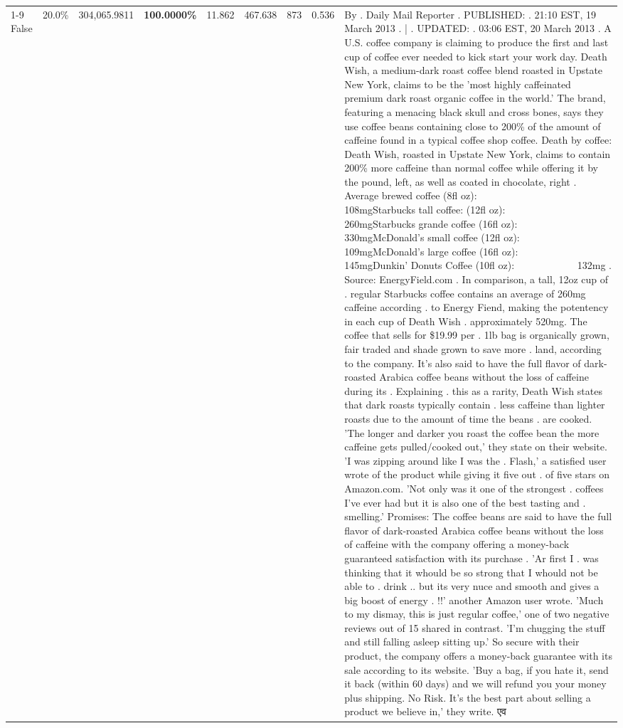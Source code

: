 \begin{table}[H]
{\begin{tabular}{lllrlllll}
\cline{1-9}
False & 20.0\% & 304,065.9811 & \bfseries \color{red} 100.0000\% & 11.862 & 467.638 & 873 & 0.536 & By . Daily Mail Reporter . PUBLISHED: . 21:10 EST, 19 March 2013 . | . UPDATED: . 03:06 EST, 20 March 2013 . A U.S. coffee company is claiming to produce the first and last cup of coffee ever needed to kick start your work day. Death Wish, a medium-dark roast coffee blend roasted in Upstate New York, claims to be the 'most highly caffeinated premium dark roast organic coffee in the world.' The brand, featuring a menacing black skull and cross bones, says they use coffee beans containing close to 200\% of the amount of caffeine found in a typical coffee shop coffee. Death by coffee: Death Wish, roasted in Upstate New York, claims to contain 200\% more caffeine than normal coffee while offering it by the pound, left, as well as coated in chocolate, right . Average brewed coffee (8fl oz):              108mgStarbucks tall coffee: (12fl oz):                260mgStarbucks grande coffee (16fl oz):         330mgMcDonald's small coffee (12fl oz):           109mgMcDonald's large coffee (16fl oz):           145mgDunkin' Donuts Coffee (10fl oz):             132mg . Source: EnergyField.com . In comparison, a tall, 12oz cup of . regular Starbucks coffee contains an average of 260mg caffeine according . to Energy Fiend, making the potentency in each cup of Death Wish . approximately 520mg. The coffee that sells for \$19.99 per . 1lb bag is organically grown, fair traded and shade grown to save more . land, according to the company. It's also said to have the full flavor of dark-roasted Arabica coffee beans without the loss of caffeine during its . Explaining . this as a rarity, Death Wish states that dark roasts typically contain . less caffeine than lighter roasts due to the amount of time the beans . are cooked. 'The longer and darker you roast the coffee bean the more caffeine gets pulled/cooked out,' they state on their website. 'I was zipping around like I was the . Flash,' a satisfied user wrote of the product while giving it five out . of five stars on Amazon.com. 'Not only was it one of the strongest . coffees I've ever had but it is also one of the best tasting and . smelling.’ Promises: The coffee beans are said to have the full flavor of dark-roasted Arabica coffee beans without the loss of caffeine with the company offering a money-back guaranteed satisfaction with its purchase . 'Ar first I . was thinking that it whould be so strong that I whould not be able to . drink .. but its very nuce and smooth and gives a big boost of energy . !!' another Amazon user wrote. 'Much to my dismay, this is just regular coffee,' one of two negative reviews out of 15 shared in contrast. 'I'm chugging the stuff and still falling asleep sitting up.' So secure with their product, the company offers a money-back guarantee with its sale according to its website. 'Buy a bag, if you hate it, send it back (within 60 days) and we will refund you your money plus shipping. No Risk. It’s the best part about selling a product we believe in,' they write. एव \\

\end{tabular}}
\end{table}
